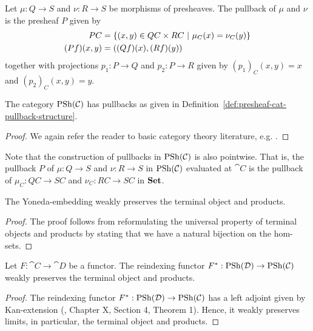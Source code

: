 \begin{defn} \label{def:presheaf-cat-pullback-structure}
Let $\mu : Q \to S$ and $\nu : R \to S$ be morphisms of presheaves. The pullback of $\mu$ and $\nu$ is the presheaf $P$ given by
\begin{align*}
PC &= \left\{ (x, y) \in QC \times RC \ |\  \mu_C(x) = \nu_C(y) \right\} \\
(Pf)(x, y) &= ((Qf)(x), (Rf)(y))
\end{align*}
together with projections $p_1 : P \to Q$ and $p_2 : P \to R$ given by $(p_1)_C(x, y) = x$ and $(p_2)_C(x, y) = y$.
\end{defn}

\begin{prop} \label{prop:presheaf-cat-pullbacks}
The category $\mathrm{PSh}(\mathcal{C})$ has pullbacks as given in Definition~\ref{def:presheaf-cat-pullback-structure}.
\begin{proof}
We again refer the reader to basic category theory literature, e.g. \cite{leinster:basic-ct}.
\end{proof}
\end{prop}

Note that the construction of pullbacks in $\mathrm{PSh}(\mathcal{C})$ is also pointwise. That is, the pullback $P$ of $\mu : Q \to S$ and $\nu : R \to S$ in $\mathrm{PSh}(\mathcal{C})$ evaluated at $\cat{C}$ is the pullback of $\mu_C : QC \to SC$ and $\nu_C : RC \to SC$ in $\mathbf{Set}$.

\begin{prop} \label{prop:yoneda-preservation}
The Yoneda-embedding weakly preserves the terminal object and products.
\begin{proof}
The proof follows from reformulating the universal property of terminal objects and products by stating that we have a natural bijection on the hom-sets.
\end{proof}
\end{prop}

\begin{prop} \label{prop:reindexing-preservation}
Let $F : \cat{C} \to \cat{D}$ be a functor. The reindexing functor $F^* : \mathrm{PSh}(\mathcal{D}) \to \mathrm{PSh}(\mathcal{C})$ weakly preserves the terminal object and products.
\begin{proof}
The reindexing functor $F^* : \mathrm{PSh}(\mathcal{D}) \to \mathrm{PSh}(\mathcal{C})$ has a left adjoint given by Kan-extension (\cite{mac2013categories}, Chapter X, Section 4, Theorem 1). Hence, it weakly preserves limits, in particular, the terminal object and products.
\end{proof}
\end{prop}

